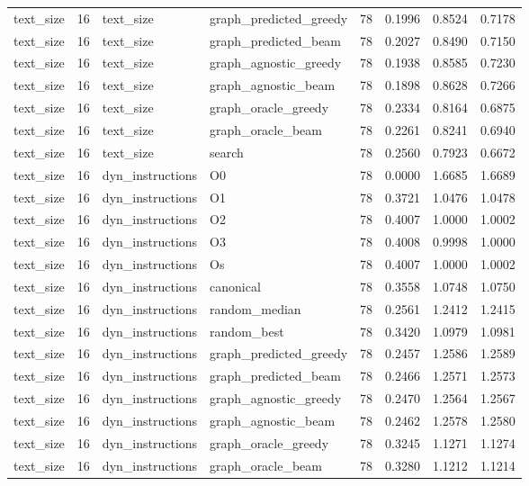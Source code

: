 \begin{table}[t]
\begin{tabular}{lrllrrrr}
text\_size & 16 & text\_size & graph\_predicted\_greedy & 78 & 0.1996 & 0.8524 & 0.7178 \\
text\_size & 16 & text\_size & graph\_predicted\_beam & 78 & 0.2027 & 0.8490 & 0.7150 \\
text\_size & 16 & text\_size & graph\_agnostic\_greedy & 78 & 0.1938 & 0.8585 & 0.7230 \\
text\_size & 16 & text\_size & graph\_agnostic\_beam & 78 & 0.1898 & 0.8628 & 0.7266 \\
text\_size & 16 & text\_size & graph\_oracle\_greedy & 78 & 0.2334 & 0.8164 & 0.6875 \\
text\_size & 16 & text\_size & graph\_oracle\_beam & 78 & 0.2261 & 0.8241 & 0.6940 \\
text\_size & 16 & text\_size & search & 78 & 0.2560 & 0.7923 & 0.6672 \\
text\_size & 16 & dyn\_instructions & O0 & 78 & 0.0000 & 1.6685 & 1.6689 \\
text\_size & 16 & dyn\_instructions & O1 & 78 & 0.3721 & 1.0476 & 1.0478 \\
text\_size & 16 & dyn\_instructions & O2 & 78 & 0.4007 & 1.0000 & 1.0002 \\
text\_size & 16 & dyn\_instructions & O3 & 78 & 0.4008 & 0.9998 & 1.0000 \\
text\_size & 16 & dyn\_instructions & Os & 78 & 0.4007 & 1.0000 & 1.0002 \\
text\_size & 16 & dyn\_instructions & canonical & 78 & 0.3558 & 1.0748 & 1.0750 \\
text\_size & 16 & dyn\_instructions & random\_median & 78 & 0.2561 & 1.2412 & 1.2415 \\
text\_size & 16 & dyn\_instructions & random\_best & 78 & 0.3420 & 1.0979 & 1.0981 \\
text\_size & 16 & dyn\_instructions & graph\_predicted\_greedy & 78 & 0.2457 & 1.2586 & 1.2589 \\
text\_size & 16 & dyn\_instructions & graph\_predicted\_beam & 78 & 0.2466 & 1.2571 & 1.2573 \\
text\_size & 16 & dyn\_instructions & graph\_agnostic\_greedy & 78 & 0.2470 & 1.2564 & 1.2567 \\
text\_size & 16 & dyn\_instructions & graph\_agnostic\_beam & 78 & 0.2462 & 1.2578 & 1.2580 \\
text\_size & 16 & dyn\_instructions & graph\_oracle\_greedy & 78 & 0.3245 & 1.1271 & 1.1274 \\
text\_size & 16 & dyn\_instructions & graph\_oracle\_beam & 78 & 0.3280 & 1.1212 & 1.1214 \\

\end{tabular}
\end{table}

